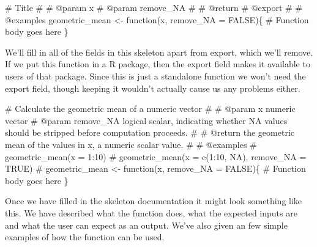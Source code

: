 \documentclass[
  letterpaper,
  DIV=11,
  numbers=noendperiod]{scrreprt}
\newenvironment{Shaded}{\begin{snugshade}}{\end{snugshade}}
\newcommand{\AttributeTok}[1]{\textcolor[rgb]{0.40,0.45,0.13}{#1}}
\newcommand{\CommentTok}[1]{\textcolor[rgb]{0.37,0.37,0.37}{#1}}
\newcommand{\ConstantTok}[1]{\textcolor[rgb]{0.56,0.35,0.01}{#1}}
\newcommand{\ControlFlowTok}[1]{\textcolor[rgb]{0.00,0.23,0.31}{#1}}
\newcommand{\NormalTok}[1]{\textcolor[rgb]{0.00,0.23,0.31}{#1}}
\newcommand{\OtherTok}[1]{\textcolor[rgb]{0.00,0.23,0.31}{#1}}
\begin{document}
\begin{Shaded}
\begin{Highlighting}[]
\CommentTok{\#\textquotesingle{} Title}
\CommentTok{\#\textquotesingle{}}
\CommentTok{\#\textquotesingle{} @param x }
\CommentTok{\#\textquotesingle{} @param remove\_NA }
\CommentTok{\#\textquotesingle{}}
\CommentTok{\#\textquotesingle{} @return}
\CommentTok{\#\textquotesingle{} @export}
\CommentTok{\#\textquotesingle{}}
\CommentTok{\#\textquotesingle{} @examples}
\NormalTok{geometric\_mean }\OtherTok{\textless{}{-}} \ControlFlowTok{function}\NormalTok{(x, }\AttributeTok{remove\_NA =} \ConstantTok{FALSE}\NormalTok{)\{}
  \CommentTok{\# Function body goes here}
\NormalTok{\}}
\end{Highlighting}
\end{Shaded}

We'll fill in all of the fields in this skeleton apart from export,
which we'll remove. If we put this function in a R package, then the
export field makes it available to users of that package. Since this is
just a standalone function we won't need the export field, though
keeping it wouldn't actually cause us any problems either.

\begin{Shaded}
\begin{Highlighting}[]
\CommentTok{\#\textquotesingle{} Calculate the geometric mean of a numeric vector}
\CommentTok{\#\textquotesingle{}}
\CommentTok{\#\textquotesingle{} @param x numeric vector}
\CommentTok{\#\textquotesingle{} @param remove\_NA logical scalar, indicating whether NA values should be stripped before computation proceeds. }
\CommentTok{\#\textquotesingle{}}
\CommentTok{\#\textquotesingle{} @return the geometric mean of the values in \textasciigrave{}x\textasciigrave{}, a numeric scalar value. }
\CommentTok{\#\textquotesingle{}}
\CommentTok{\#\textquotesingle{} @examples}
\CommentTok{\#\textquotesingle{} geometric\_mean(x = 1:10)}
\CommentTok{\#\textquotesingle{} geometric\_mean(x = c(1:10, NA), remove\_NA = TRUE)}
\CommentTok{\#\textquotesingle{} }
\NormalTok{geometric\_mean }\OtherTok{\textless{}{-}} \ControlFlowTok{function}\NormalTok{(x, }\AttributeTok{remove\_NA =} \ConstantTok{FALSE}\NormalTok{)\{}
  \CommentTok{\# Function body goes here}
\NormalTok{\}}
\end{Highlighting}
\end{Shaded}

Once we have filled in the skeleton documentation it might look
something like this. We have described what the function does, what the
expected inputs are and what the user can expect as an output. We've
also given an few simple examples of how the function can be used.
\end{document}
